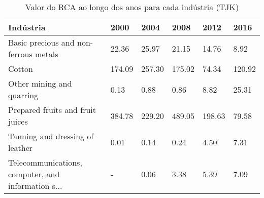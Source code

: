 \begin{table}
\centering
\caption{Valor do RCA ao longo dos anos para cada indústria (TJK)}
\begin{tabular}{p{6cm}p{1.5cm}p{1.5cm}p{1.5cm}p{1.5cm}p{1.5cm}}
\toprule
                                         Indústria &   2000 &   2004 &   2008 &   2012 &   2016 \\
\midrule
             Basic precious and non-ferrous metals &  22.36 &  25.97 &  21.15 &  14.76 &   8.92 \\
                                            Cotton & 174.09 & 257.30 & 175.02 &  74.34 & 120.92 \\
                         Other mining and quarring &   0.13 &   0.88 &   0.86 &   8.82 &  25.31 \\
                  Prepared fruits and fruit juices & 384.78 & 229.20 & 489.05 & 198.63 &  79.58 \\
                   Tanning and dressing of leather &   0.01 &   0.14 &   0.24 &   4.50 &   7.31 \\
Telecommunications, computer, and information s... &      - &   0.06 &   3.38 &   5.39 &   7.09 \\
\bottomrule
\end{tabular}
\end{table}
